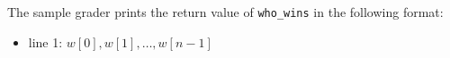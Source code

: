 The sample grader prints the return value of \texttt{who\_wins} in the following format:
\begin{itemize}
\item line 1: $w[0], w[1], \ldots, w[n - 1]$
\end{itemize}
